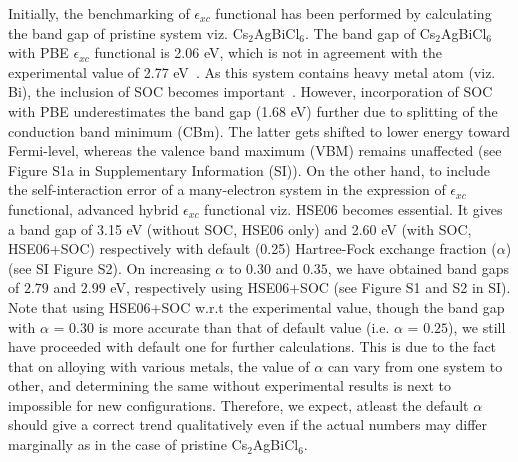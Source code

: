 \documentclass[journal=jpclcd,manuscript=letter]{achemso}
\begin{document}

Initially, the benchmarking of $\epsilon_{xc}$ functional has been performed by calculating the band gap of pristine system viz. Cs$_2$AgBiCl$_6$. 
The band gap of Cs$_2$AgBiCl$_6$ with PBE $\epsilon_{xc}$ functional is 2.06 eV, which is not in agreement with the experimental value of 2.77 eV~\cite{mcclure2016cs2agbix6}. As this system contains heavy metal atom (viz. Bi), the inclusion of SOC becomes important~\cite{PhysRevB.101.054108}.
However, incorporation of SOC with PBE underestimates the band gap (1.68 eV) further due to splitting of the conduction band minimum (CBm). The latter gets shifted to lower energy toward Fermi-level, whereas the valence band maximum (VBM) remains unaffected (see Figure S1a in Supplementary Information (SI)). %
On the other hand, to include the self-interaction error of a many-electron system in the expression of $\epsilon_{xc}$ functional, advanced hybrid $\epsilon_{xc}$ functional viz. HSE06 becomes essential. It gives a band gap of 3.15 eV (without SOC, HSE06 only) and 2.60 eV (with SOC, HSE06+SOC) respectively with default (0.25) Hartree-Fock exchange fraction ($\alpha$) (see SI Figure S2). On increasing $\alpha$ to $0.30$ and $0.35$, we have obtained band gaps of $2.79$ and $2.99$ eV, respectively using HSE06+SOC (see Figure S1 and S2 in SI). Note that using HSE06+SOC w.r.t the experimental value, though the band gap with $\alpha$ = $0.30$ is more accurate than that of default value (i.e. $\alpha$ = $0.25$), we still have proceeded with default one for further calculations. This is due to the fact that on alloying with various metals, the value of $\alpha$ can vary from one system to other, and determining the same without experimental results is next to impossible for new configurations. Therefore, we expect, atleast the default $\alpha$ should give a correct trend qualitatively even if the actual numbers may differ marginally as in the case of pristine Cs$_2$AgBiCl$_6$.
\end{document}
